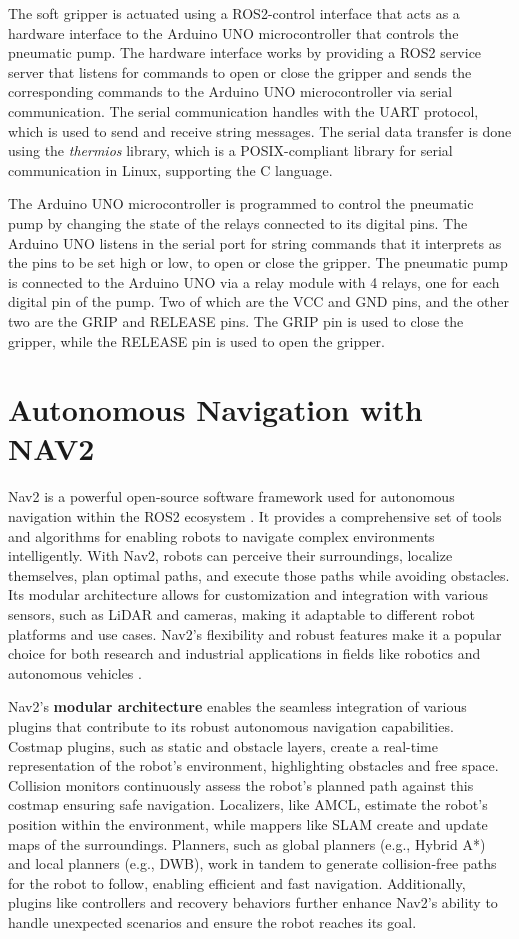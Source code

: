 The soft gripper is actuated using a ROS2-control interface that acts as a hardware interface to the Arduino UNO
microcontroller that controls the pneumatic pump. The hardware interface works by providing a ROS2 service server that 
listens for commands to open or close the gripper and sends the corresponding commands to the Arduino UNO microcontroller
via serial communication. 
The serial communication handles with the UART protocol, which is used to send and receive string messages.
The serial data transfer is done using the \textit{thermios} library, which is a POSIX-compliant library for serial
communication in Linux, supporting the C language.

The Arduino UNO microcontroller is programmed to control the pneumatic pump by changing
the state of the relays connected to its digital pins. The Arduino UNO listens in the serial port for string commands
that it interprets as the pins to be set high or low, to open or close the gripper. The pneumatic pump is connected
to the Arduino UNO via a relay module with 4 relays, one for each digital pin of the pump. Two of which
are the VCC and GND pins, and the other two are the GRIP and RELEASE pins. The GRIP pin is used to close the gripper,
while the RELEASE pin is used to open the gripper.

\section{Autonomous Navigation with NAV2}

Nav2 is a powerful open-source software framework used for autonomous navigation within the ROS2 ecosystem
\cite{macenski2020nav2}.
It provides a comprehensive set of tools and algorithms for enabling robots to navigate complex environments intelligently.
With Nav2, robots can perceive their surroundings, localize themselves, plan optimal paths, and execute 
those paths while avoiding obstacles. Its modular architecture allows for customization and integration with various sensors,
such as LiDAR and cameras, making it adaptable to different robot platforms and use cases. 
Nav2's flexibility and robust features make it a popular choice for both research and industrial applications 
in fields like robotics and autonomous vehicles
\cite{macenski2023survey}.

Nav2's \textbf{modular architecture} enables the seamless integration of various plugins that contribute
to its robust autonomous navigation capabilities. Costmap plugins, such as static and obstacle layers,
create a real-time representation of the robot's environment, highlighting obstacles and free space. 
Collision monitors continuously assess the robot's planned path against this costmap ensuring safe navigation.
Localizers, like AMCL, estimate the robot's position within the environment, while mappers like SLAM create and update maps
of the surroundings. Planners, such as global planners (e.g., Hybrid A*) and local planners (e.g., DWB),
work in tandem to generate collision-free paths for the robot to follow, enabling efficient and fast navigation. 
Additionally, plugins like controllers and recovery behaviors further enhance Nav2's ability to handle unexpected
scenarios and ensure the robot reaches its goal.

